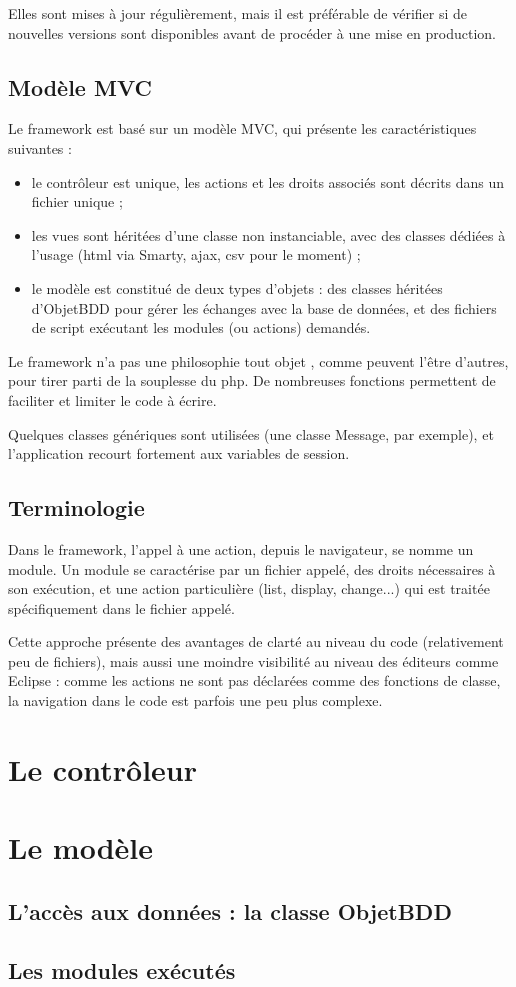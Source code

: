 \documentclass[12pt
,a4paper
,titlepage
,twoside
]{book}
\begin{document}
Elles sont mises à jour régulièrement, mais il est préférable de vérifier si de nouvelles versions sont disponibles avant de procéder à une mise en production.

\section{Modèle MVC}

Le framework est basé sur un modèle MVC, qui présente les caractéristiques suivantes :
\begin{itemize}
\item le contrôleur est unique, les actions et les droits associés sont décrits dans un fichier unique ;
\item les vues sont héritées d'une classe non instanciable, avec des classes dédiées à l'usage (html via Smarty, ajax, csv pour le moment) ;
\item le modèle est constitué de deux types d'objets : des classes héritées d'ObjetBDD pour gérer les échanges avec la base de données, et des fichiers de script exécutant les modules (ou actions) demandés.
\end{itemize}

Le framework n'a pas une philosophie \og tout objet \fg{}, comme peuvent l'être d'autres, pour tirer parti de la souplesse du php. De nombreuses fonctions permettent de faciliter et limiter le code à écrire.

Quelques classes génériques sont utilisées (une classe Message, par exemple), et l'application recourt fortement aux variables de session. 

\section{Terminologie}

Dans le framework, l'appel à une action, depuis le navigateur, se nomme un module. Un module se caractérise par un fichier appelé, des droits nécessaires à son exécution, et une action particulière (list, display, change...) qui est traitée spécifiquement dans le fichier appelé.

Cette approche présente des avantages de clarté au niveau du code (relativement peu de fichiers), mais aussi une moindre visibilité au niveau des éditeurs comme Eclipse : comme les actions ne sont pas déclarées comme des fonctions de classe, la navigation dans le code est parfois une peu plus complexe.

\chapter{Le contrôleur}

\chapter{Le modèle}
\section{L'accès aux données : la classe ObjetBDD}

\section{Les modules exécutés}
\end{document}
